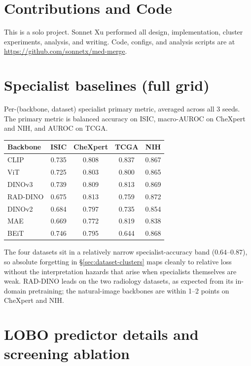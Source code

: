 \documentclass{article}
\begin{document}
\section{Contributions and Code}

This is a solo project. Sonnet Xu performed all design, implementation, cluster experiments, analysis, and writing. Code, configs, and analysis scripts are at \url{https://github.com/sonnetx/med-merge}.

\newpage



\newpage
\appendix

\section{Specialist baselines (full grid)}

Per-(backbone, dataset) specialist primary metric, averaged across all 3 seeds. The primary metric is balanced accuracy on ISIC, macro-AUROC on CheXpert and NIH, and AUROC on TCGA.

\begin{center}
\small
\begin{tabular}{lcccc}
\toprule
Backbone & ISIC & CheXpert & TCGA & NIH \\
\midrule
CLIP     & 0.735 & 0.808 & 0.837 & 0.867 \\
ViT      & 0.725 & 0.803 & 0.800 & 0.865 \\
DINOv3   & 0.739 & 0.809 & 0.813 & 0.869 \\
RAD-DINO & 0.675 & 0.813 & 0.759 & 0.872 \\
DINOv2   & 0.684 & 0.797 & 0.735 & 0.854 \\
MAE      & 0.669 & 0.772 & 0.819 & 0.838 \\
BEiT     & 0.746 & 0.795 & 0.644 & 0.868 \\
\bottomrule
\end{tabular}
\end{center}

The four datasets sit in a relatively narrow specialist-accuracy band ($0.64$--$0.87$), so absolute forgetting in \S\ref{sec:dataset-clusters} maps cleanly to relative loss without the interpretation hazards that arise when specialists themselves are weak. RAD-DINO leads on the two radiology datasets, as expected from its in-domain pretraining; the natural-image backbones are within 1--2 points on CheXpert and NIH.

\section{LOBO predictor details and screening ablation}
\label{sec:predictability}
\end{document}
